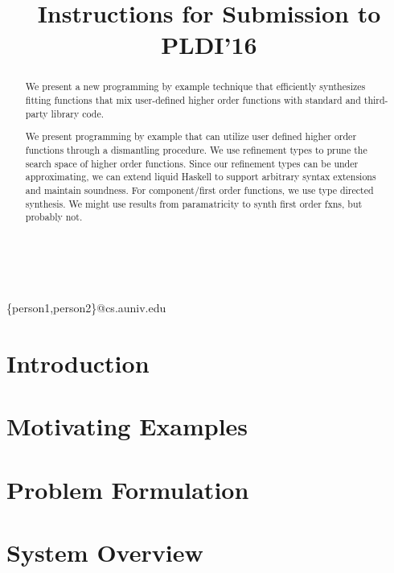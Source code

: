 \documentclass[pldi]{sigplanconf-pldi16}
\begin{document}
\title{Instructions for Submission to PLDI'16}

%
%

{ \\
  \\
}
{\{person1,person2\}@cs.auniv.edu}



\maketitle

\begin{abstract}
We present a new programming by example technique that efficiently synthesizes fitting functions that mix user-defined higher order functions with standard and third-party library code.

We present programming by example that can utilize user defined higher order functions through a dismantling procedure. We use refinement types to prune the search space of higher order functions. Since our refinement types can be under approximating, we can extend liquid Haskell to support arbitrary syntax extensions and maintain soundness. For component/first order functions, we use type directed synthesis. We might use results from paramatricity to synth first order fxns, but probably not.
\end{abstract}


\section{Introduction} \label{intro}


\section{Motivating Examples} \label{examples}


\section{Problem Formulation} \label{problem}


\section{System Overview}

\end{document}
